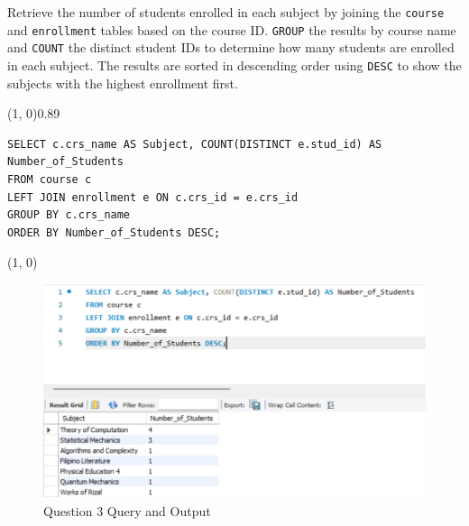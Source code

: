 
Retrieve the number of students enrolled in each subject by joining the \texttt{course} and \texttt{enrollment} tables based on the course ID. \texttt{GROUP} the results by course name and \texttt{COUNT} the distinct student IDs to determine how many students are enrolled in each subject. The results are sorted in descending order using \texttt{DESC} to show the subjects with the highest enrollment first.
\vspace{\baselineskip}

\sol{}
\noindent\line(1, 0){0.89\linewidth}
\begin{verbatim}
SELECT c.crs_name AS Subject, COUNT(DISTINCT e.stud_id) AS Number_of_Students
FROM course c
LEFT JOIN enrollment e ON c.crs_id = e.crs_id
GROUP BY c.crs_name
ORDER BY Number_of_Students DESC;
\end{verbatim}
\noindent\line(1, 0){\linewidth}

\begin{figure}[H]
    \centering
    \includegraphics[width=0.7\linewidth]{images/q3.png}
    \caption{Question 3 Query and Output}
\end{figure}
